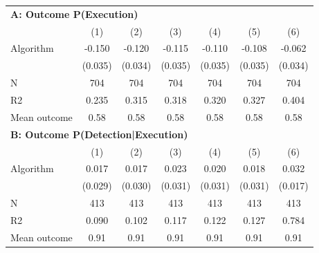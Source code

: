 \begin{tabular}{lcccccc} \toprule
\multicolumn{7}{l}{\textbf{A: Outcome P(Execution)}} \\ \multicolumn{1}{l}{} & (1) & (2) & (3) & (4) & (5) & (6) \\ \midrule
Algorithm   &      -0.150\sym{***}&      -0.120\sym{***}&      -0.115\sym{***}&      -0.110\sym{***}&      -0.108\sym{***}&      -0.062\sym{*}  \\
            &     (0.035)         &     (0.034)         &     (0.035)         &     (0.035)         &     (0.035)         &     (0.034)         \\
\midrule
N           &         704         &         704         &         704         &         704         &         704         &         704         \\
R2          &       0.235         &       0.315         &       0.318         &       0.320         &       0.327         &       0.404         \\
Mean outcome&        0.58         &        0.58         &        0.58         &        0.58         &        0.58         &        0.58         \\

\midrule \multicolumn{7}{l}{\textbf{B: Outcome P(Detection|Execution)}} \\ \multicolumn{1}{l}{} & (1) & (2) & (3) & (4) & (5) & (6) \\ \midrule
Algorithm   &       0.017         &       0.017         &       0.023         &       0.020         &       0.018         &       0.032\sym{*}  \\
            &     (0.029)         &     (0.030)         &     (0.031)         &     (0.031)         &     (0.031)         &     (0.017)         \\
\midrule
N           &         413         &         413         &         413         &         413         &         413         &         413         \\
R2          &       0.090         &       0.102         &       0.117         &       0.122         &       0.127         &       0.784         \\
Mean outcome&        0.91         &        0.91         &        0.91         &        0.91         &        0.91         &        0.91         \\


\end{tabular}
